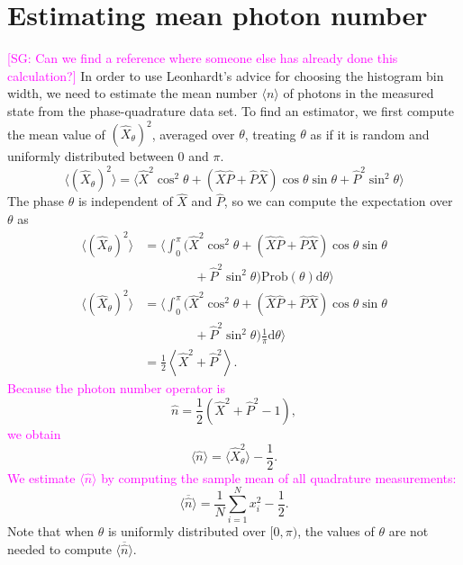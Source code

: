 \documentclass[
reprint,
superscriptaddress,
showpacs,
amsmath,
amssymb,
aps,
pra,
longbibliography
]{revtex4-1}
\providecommand{\aucmnt}[1]{#1}
\providecommand{\editcolor}[2]{\textcolor{#1}{#2}}
\providecommand{\aucmnt}[1]{}
\providecommand{\editcolor}[2]{#2}
\newcommand{\SG}[1]{\editcolor{magenta}{#1}}
\newcommand{\SGc}[1]{\aucmnt{\editcolor{magenta}{[SG: #1]}}}
\begin{document}
\section{Estimating mean photon number}
\label{sec-photon-estimation}
\SGc{Can we find a reference where someone else has already done this
  calculation?} In order to use Leonhardt's advice for choosing the
histogram bin width, we need to estimate the mean number
$\langle n \rangle$ of photons in the measured state from the
phase-quadrature data set.  To find an estimator, we first compute the
mean value of $(\hat{X}_{\theta})^{2}$, averaged over $\theta$,
treating $\theta$ as if it is random and uniformly distributed between
$0$ and $\pi$.
\begin{equation}
  \langle (\hat{X}_{\theta})^{2} \rangle = \langle \hat{X}^{2}\cos^{2}\theta + (\hat{X}\hat{P}+\hat{P}\hat{X})\cos\theta\sin\theta + \hat{P}^{2}\sin^{2}\theta \rangle
\end{equation}
The phase $\theta$ is independent of $\hat{X}$ and $\hat{P}$, so we
can compute the expectation over $\theta$ as
\begin{align}
  \langle (\hat{X}_{\theta})^{2} \rangle &= \Big\langle \int_{0}^{\pi} (\hat{X}^{2}\cos^{2}\theta + (\hat{X}\hat{P}+\hat{P}\hat{X})\cos\theta\sin\theta \nonumber \\
                                         & \qquad \qquad + \hat{P}^{2}\sin^{2}\theta) \mathrm{Prob}(\theta) \mathrm{d}\theta \Big\rangle \\
  \langle (\hat{X}_{\theta})^{2} \rangle &= \Big\langle \int_{0}^{\pi} (\hat{X}^{2}\cos^{2}\theta + (\hat{X}\hat{P}+\hat{P}\hat{X})\cos\theta\sin\theta \nonumber \\
                                         & \qquad \qquad + \hat{P}^{2}\sin^{2}\theta) \frac{1}{\pi} \mathrm{d}\theta \Big\rangle \\
                                         &= \frac{1}{2}\left\langle \hat{X}^{2} + \hat{P}^{2} \right\rangle.
\end{align}
\SG{Because the photon number operator is}
\begin{equation}
  \hat{n} = \frac{1}{2}\left(\hat{X}^{2}+\hat{P}^{2}-1\right),
\end{equation}
\SG{we obtain}
\begin{equation}
  \langle\hat{n}\rangle = \langle \hat{X}_{\theta}^{2}\rangle-\frac{1}{2}. 
\end{equation}
\SG{We estimate $\langle \hat{n} \rangle$ by computing the sample
  mean of all quadrature measurements:}
\begin{equation}
  \overline{\langle \hat{n} \rangle} = \frac{1}{N} \sum_{i=1}^{N}x_{i}^{2} - \frac{1}{2}.
  \label{eq-photon-estimation}
\end{equation}
Note that when $\theta$ is uniformly distributed over $[0,\pi)$, the
values of $\theta$ are not needed to compute
$\overline{\langle \hat{n} \rangle}$.  
\end{document}
